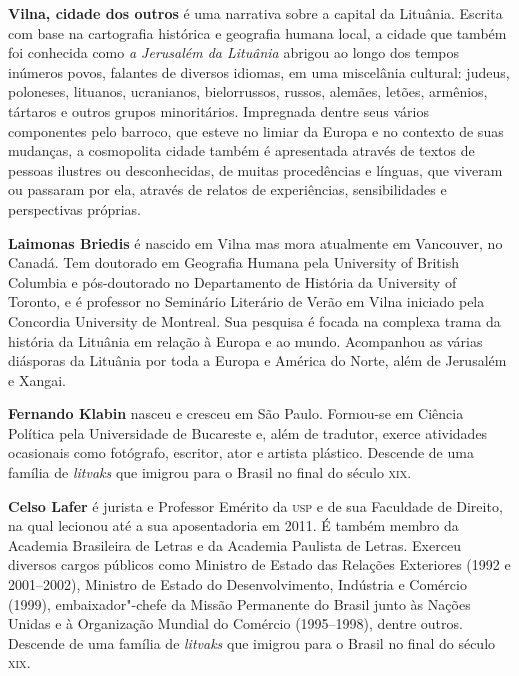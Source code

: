 \textbf{Vilna, cidade dos outros} é uma narrativa sobre a capital da Lituânia. Escrita com base na cartografia histórica e geografia humana local, a cidade que também foi conhecida como \textit{a Jerusalém da Lituânia} abrigou ao longo dos tempos inúmeros povos, falantes de diversos idiomas, em uma miscelânia cultural: judeus, poloneses, lituanos, ucranianos, bielorrussos, russos, alemães, letões, armênios, tártaros e outros grupos minoritários. Impregnada dentre seus vários componentes pelo barroco, que esteve no limiar da Europa e no contexto de suas mudanças, a cosmopolita cidade também é apresentada através de textos de pessoas ilustres ou desconhecidas, de muitas procedências e línguas, que viveram ou passaram por ela, através de relatos de experiências, sensibilidades e perspectivas próprias.

\textbf{Laimonas Briedis} é nascido em Vilna mas mora atualmente em Vancouver, no Canadá. Tem doutorado em Geografia Humana pela University of British Columbia e pós-doutorado no Departamento de História da University of Toronto, e é professor no Seminário Literário de Verão em Vilna iniciado pela Concordia University de Montreal. Sua pesquisa é focada na complexa trama da história da Lituânia em relação à Europa e ao mundo. Acompanhou as várias diásporas da Lituânia por toda a Europa e América do Norte, além de Jerusalém e Xangai.

\textbf{Fernando Klabin} nasceu e cresceu em São Paulo. Formou-se em Ciência Política pela Universidade de Bucareste e, além de tradutor, exerce atividades ocasionais como fotógrafo, escritor, ator e artista plástico. Descende de uma família de \textit{litvaks} que imigrou para o Brasil no final do século \textsc{xix}.

\textbf{Celso Lafer} é jurista e Professor Emérito da \textsc{usp} e de sua Faculdade de Direito, na qual lecionou até a sua aposentadoria em 2011. É também membro da Academia Brasileira de Letras e da Academia Paulista de Letras. Exerceu diversos cargos públicos como Ministro de Estado das Relações Exteriores (1992 e 2001--2002), Ministro de Estado do Desenvolvimento, Indústria e Comércio (1999), embaixador"-chefe da Missão Permanente do Brasil junto às Nações Unidas e à Organização Mundial do Comércio (1995--1998), dentre outros. Descende de uma família de \textit{litvaks} que imigrou para o Brasil no final do século \textsc{xix}.




